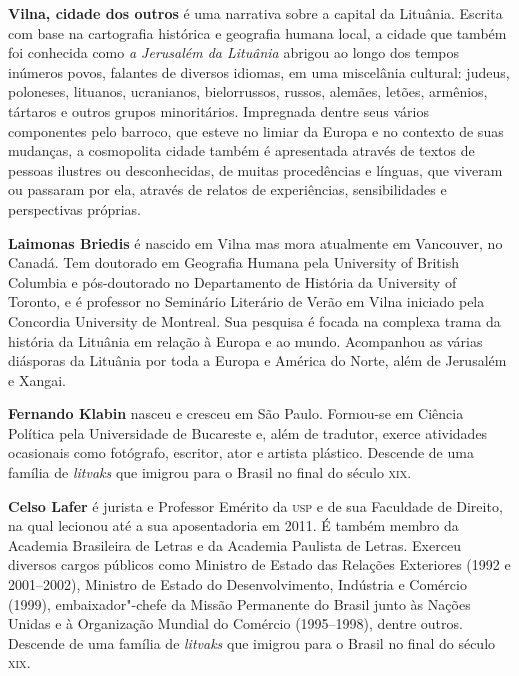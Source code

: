 \textbf{Vilna, cidade dos outros} é uma narrativa sobre a capital da Lituânia. Escrita com base na cartografia histórica e geografia humana local, a cidade que também foi conhecida como \textit{a Jerusalém da Lituânia} abrigou ao longo dos tempos inúmeros povos, falantes de diversos idiomas, em uma miscelânia cultural: judeus, poloneses, lituanos, ucranianos, bielorrussos, russos, alemães, letões, armênios, tártaros e outros grupos minoritários. Impregnada dentre seus vários componentes pelo barroco, que esteve no limiar da Europa e no contexto de suas mudanças, a cosmopolita cidade também é apresentada através de textos de pessoas ilustres ou desconhecidas, de muitas procedências e línguas, que viveram ou passaram por ela, através de relatos de experiências, sensibilidades e perspectivas próprias.

\textbf{Laimonas Briedis} é nascido em Vilna mas mora atualmente em Vancouver, no Canadá. Tem doutorado em Geografia Humana pela University of British Columbia e pós-doutorado no Departamento de História da University of Toronto, e é professor no Seminário Literário de Verão em Vilna iniciado pela Concordia University de Montreal. Sua pesquisa é focada na complexa trama da história da Lituânia em relação à Europa e ao mundo. Acompanhou as várias diásporas da Lituânia por toda a Europa e América do Norte, além de Jerusalém e Xangai.

\textbf{Fernando Klabin} nasceu e cresceu em São Paulo. Formou-se em Ciência Política pela Universidade de Bucareste e, além de tradutor, exerce atividades ocasionais como fotógrafo, escritor, ator e artista plástico. Descende de uma família de \textit{litvaks} que imigrou para o Brasil no final do século \textsc{xix}.

\textbf{Celso Lafer} é jurista e Professor Emérito da \textsc{usp} e de sua Faculdade de Direito, na qual lecionou até a sua aposentadoria em 2011. É também membro da Academia Brasileira de Letras e da Academia Paulista de Letras. Exerceu diversos cargos públicos como Ministro de Estado das Relações Exteriores (1992 e 2001--2002), Ministro de Estado do Desenvolvimento, Indústria e Comércio (1999), embaixador"-chefe da Missão Permanente do Brasil junto às Nações Unidas e à Organização Mundial do Comércio (1995--1998), dentre outros. Descende de uma família de \textit{litvaks} que imigrou para o Brasil no final do século \textsc{xix}.




